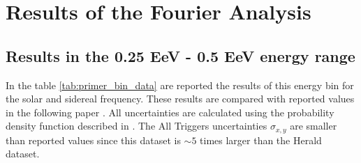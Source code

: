 \documentclass[12pt, doublespace, oneside]{article}
\begin{document}
\section{Results of the Fourier Analysis}
\subsection{Results in the 0.25 EeV - 0.5 EeV energy range}


In the table \ref{tab:primer_bin_data} are reported the results of this energy bin for the solar and sidereal frequency. These results are compared with reported values in the following paper \cite{Aab_2020}. All uncertainties are calculated using the probability density function described in \cite{linsley1975fluctuation}. The All Triggers uncertainties $\sigma_{x,y}$ are smaller than reported values since this dataset is $\sim 5$ times larger than the Herald dataset.
\end{document}
